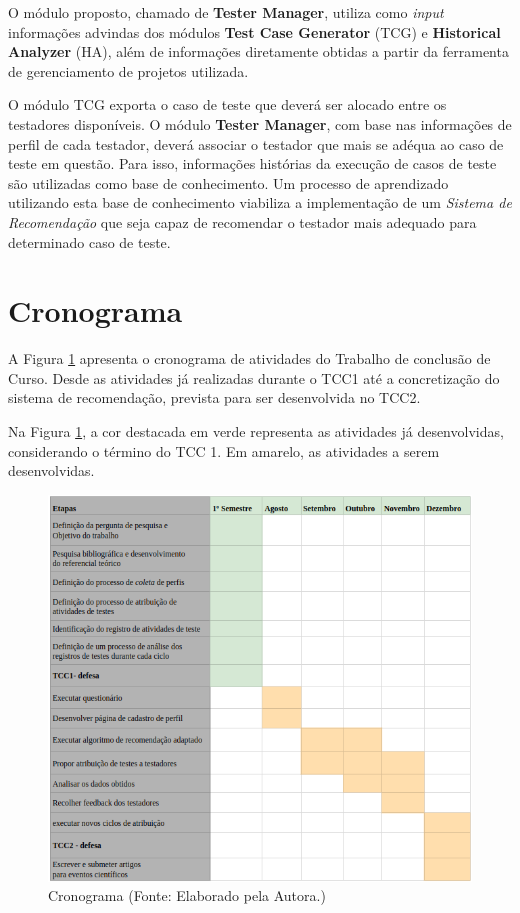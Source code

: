 O módulo proposto, chamado de \textbf{Tester Manager}, utiliza como \textit{input} informações advindas dos módulos \textbf{Test Case Generator} (TCG) e \textbf{Historical Analyzer} (HA), além de informações diretamente obtidas a partir da ferramenta de gerenciamento de projetos utilizada.

O módulo TCG exporta o caso de teste que deverá ser alocado entre os testadores disponíveis. O módulo \textbf{Tester Manager}, com base nas informações de perfil de cada testador, deverá associar o testador que mais se adéqua ao caso de teste em questão. Para isso, informações histórias da execução de casos de teste são utilizadas como base de conhecimento. Um processo de aprendizado utilizando esta base de conhecimento viabiliza a implementação de um \textit{Sistema de Recomendação} que seja capaz de recomendar o testador mais adequado para determinado caso de teste.


\section{Cronograma}

A Figura \ref{fig:cronograma} apresenta o cronograma de atividades do Trabalho de conclusão de Curso. Desde as atividades já realizadas durante o TCC1 até a concretização do sistema de recomendação, prevista para ser desenvolvida no TCC2.

Na Figura \ref{fig:cronograma}, a cor destacada em verde representa as atividades já desenvolvidas, considerando o término do TCC 1. Em amarelo, as atividades a serem desenvolvidas.

        \begin{figure}[H]
          \centering
          \includegraphics[width=15cm]{figuras/cronograma.png}
          \caption{Cronograma (Fonte: Elaborado pela Autora.)}
          \label{fig:cronograma}

        \end{figure}

